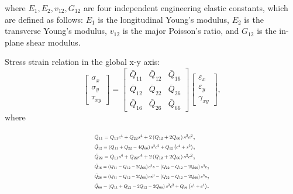 where $E_1, E_2, v_{12}, G_{12} $ are four independent engineering elastic constants, which are defined as follows: $E_1 $ is the longitudinal Young's modulus, $E_2 $ is the transverse Young's modulus, $v_{12} $ is the major Poisson's ratio, and $G_{12} $ is the in-plane shear modulus.

Stress strain relation in the global x-y axis:
\begin{equation}
	\left[\begin{array}{l}\sigma _{x} \\ 
		\sigma _{y} \\ 
		\tau_{xy}
	\end{array}\right]=
	\left[\begin{array}{lll}
		\bar{Q}_{11} & \bar{Q}_{12} & \bar{Q}_{16}\\ 
	    \bar{Q}_{12} & \bar{Q}_{22} & \bar{Q}_{26} \\ 
	    \bar{Q}_{16} & \bar{Q}_{26} &\bar{Q}_{66}
	\end{array}\right]\left[\begin{array}{l}\varepsilon_{x} \\ 
	\varepsilon_{y}\\ \gamma_{x y}\end{array}\right] \textstyle{,}
\end{equation}
where

\begin{equation}
	\begin{array}{l}
		\resizebox{.35\textwidth}{!}{$\bar{Q}_{11}=Q_{11} c^{4}+Q_{22} s^{4}+2\left(Q_{12}+2
		Q_{66}\right) s^{2} c^{2}$} \textstyle{,}\\
		\resizebox{.35\textwidth}{!}{$\bar{Q}_{12}=\left(Q_{11}+Q_{22}-4 Q_{66}\right) s^{2}
		c^{2}+Q_{12}\left(c^{4}+s^{2}\right)$} \textstyle{,}\\
		\resizebox{.35\textwidth}{!}{$\bar{Q}_{22}=Q_{11} s^{4}+Q_{22} c^{4}+2\left(Q_{12}+2
		Q_{66}\right) s^{2} c^{2}$} \textstyle{,}\\
		\resizebox{.4\textwidth}{!}{$\bar{Q}_{16}=\left(Q_{11}-Q_{12}-2 Q_{66}\right) c^{3} s-\left(Q_{22}-Q_{12}-2Q_{66}\right) s^{3} c$}\textstyle{,}
		 \\ 
		\resizebox{.4\textwidth}{!}{$\bar{Q}_{26}=\left(Q_{11}-Q_{12}-2 Q_{66}\right) c s^{3}-\left(Q_{22}-Q_{12}-2 Q_{66}\right)c^{3} s$}\textstyle{,}
		 \\ 
	\resizebox{.4\textwidth}{!}	{$\bar{Q}_{66}=\left(Q_{11}+Q_{22}-2 Q_{12}-2 Q_{66}\right)
	s^{2}c^{2}+Q_{66}\left(s^{4}+c^{4}\right)$}\textstyle{.}\\
	\end{array}
\end{equation}


